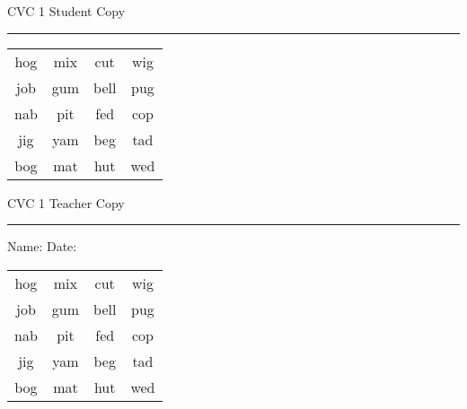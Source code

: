 \documentclass{memoir}
\begin{document}

\footnotesize \noindent
CVC 1 \hfill Student Copy
\smallskip
\hrule

\huge

\setlength{\tabcolsep}{14pt}
\def\arraystretch{2}

{\selectfont


\begin{vplace}[0.5]
\begin{center}
\begin{tabular}{cccc}
hog & mix & cut & wig \\
job & gum  & bell & pug \\
nab & pit & fed & cop \\
jig & yam & beg & tad \\
bog & mat & hut & wed \\
\end{tabular}
\end{center}
\end{vplace}

}

\newpage

\footnotesize \noindent
CVC 1 \hfill Teacher Copy
\smallskip
\hrule

\normalsize

\vfill

\noindent
Name: \underline{\hspace{1.75in}} \hfill Date: \underline{\hspace{1in}}

\huge

{\selectfont


\begin{vplace}[0.5]
\begin{center}
\begin{tabular}{cccc}
hog & mix & cut & wig \\
job & gum  & bell & pug \\
nab & pit & fed & cop \\
jig & yam & beg & tad \\
bog & mat & hut & wed \\
\end{tabular}
\end{center}
\end{vplace}



}
\end{document}
